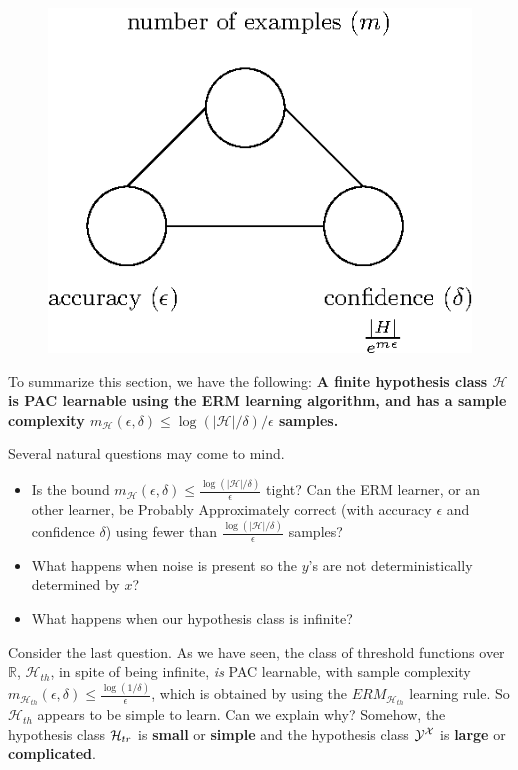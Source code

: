\documentclass[11pt]{article}
\newcommand{\Hc}{\mathcal{H}}
\begin{document}
  \begin{figure}[h!]
 \centering\includegraphics[scale=0.8]{connection_m_eps_delta_finite3.eps}
 \end{figure}

To summarize this section, we have  the following:
{\bf A finite hypothesis class $\Hc$ is PAC learnable using the ERM learning algorithm, and has a sample complexity  $m_\Hc(\epsilon,\delta)\leq \log(|\Hc|/\delta)/\epsilon$ samples.}

Several natural questions may come to mind.

  \begin{itemize}
\item Is the bound $m_\Hc(\epsilon,\delta) \le \frac{\log(|\Hc|/\delta)}{\epsilon}$ tight? Can the ERM learner, or an other learner, be Probably Approximately correct (with accuracy $\epsilon$ and confidence $\delta$) using fewer than 
$\frac{\log(|\Hc|/\delta)}{\epsilon}$ samples?
\item What happens when noise is present so the $y$'s are not deterministically determined by $x$?
\item What happens when our  hypothesis class is infinite?
  \end{itemize}

Consider the last question. As we have seen,  the  class of threshold functions
over $\mathbb{R}$,  $\Hc_{th}$, in spite of being infinite, \textit{is}  PAC
learnable, with sample complexity $m_{\Hc_{th}}(\epsilon,\delta)
\le\frac{\log(1/\delta)}{\epsilon}$, which is obtained by using the
$ERM_{\Hc_{th}}$ learning rule. So  $\Hc_{th}$ appears to be simple to learn.
Can we explain why? Somehow, the hypothesis class $\mathcal{H}_{tr}$ is {\bf small} or
{\bf simple} and the hypothesis class $\mathcal{Y}^{\mathcal{X}}$ is {\bf large} or {\bf complicated}. 
\end{document}
